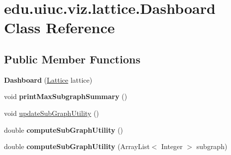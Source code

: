 \hypertarget{classedu_1_1uiuc_1_1viz_1_1lattice_1_1_dashboard}{}\section{edu.\+uiuc.\+viz.\+lattice.\+Dashboard Class Reference}
\label{classedu_1_1uiuc_1_1viz_1_1lattice_1_1_dashboard}
\subsection*{Public Member Functions}
\begin{DoxyCompactItemize}
\item 
\mbox{\label{classedu_1_1uiuc_1_1viz_1_1lattice_1_1_dashboard_a83bacc8cc865c52d117da3c3b8106997}} 
{\bfseries Dashboard} (\mbox{\hyperlink{classedu_1_1uiuc_1_1viz_1_1lattice_1_1_lattice}{Lattice}} lattice)
\item 
\mbox{\label{classedu_1_1uiuc_1_1viz_1_1lattice_1_1_dashboard_a32e19ee9f892aa7f1fb7d251278d66e6}} 
void {\bfseries print\+Max\+Subgraph\+Summary} ()
\item 
void \mbox{\hyperlink{classedu_1_1uiuc_1_1viz_1_1lattice_1_1_dashboard_a8df0f4fca22aceb9de4f568f6f54b85b}{update\+Sub\+Graph\+Utility}} ()
\item 
\mbox{\label{classedu_1_1uiuc_1_1viz_1_1lattice_1_1_dashboard_a0942c1a235aca52a4c1f80235813d120}} 
double {\bfseries compute\+Sub\+Graph\+Utility} ()
\item 
\mbox{\label{classedu_1_1uiuc_1_1viz_1_1lattice_1_1_dashboard_ab413ae46a725f3d8de383acdacd58013}} 
double {\bfseries compute\+Sub\+Graph\+Utility} (Array\+List$<$ Integer $>$ subgraph)
\end{DoxyCompactItemize}
